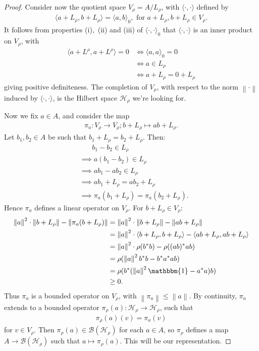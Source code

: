 \documentclass[11pt,a4paper]{report}
\theoremstyle{plain}
\theoremstyle{definition}
\newcommand{\1}{\mathbbm{1}}
\newcommand{\B}{\mathcal{B}}
\newcommand{\Hr}{\mathcal{H}_\rho}
\newcommand{\Vr}{V_\rho}
\begin{document}
\begin{proof}
	
	Consider now the quotient space $V_\rho = A / L_\rho$, with $\langle 
	\cdot,\cdot\rangle$ defined by
	\begin{align*}
		\langle a+L_\rho,b+L_\rho \rangle = \langle a,b\rangle_0, 
		\mbox{ for } a+L_\rho,b+L_\rho \in V_\rho.
	\end{align*}
	It follows from properties (i),~(ii) and (iii) of $\langle \cdot,\cdot  \rangle 
	_0$ that $\langle \cdot,\cdot  \rangle$ is an inner product on $V_\rho$, with
	\begin{align*}
				\langle a + L^\rho, a + L^\rho \rangle = 0
		&\iff 	\langle a,a\rangle_0=0													\\
		&\iff 	a \in L_\rho															\\
		&\iff 	a+L_\rho = 0+L_\rho
	\end{align*}
	giving positive definiteness.
	The completion of $V_\rho$, with respect to the norm $\left\|\cdot\right\|$ 
	induced by $\langle\cdot,\cdot \rangle$, is the Hilbert space $\Hr$ we're 
	looking for.

	Now we fix $a \in A$, and consider the map 
	\begin{align*}
		\pi_a : V_\rho \to V_\rho; b+L_\rho \mapsto ab+L_\rho.
	\end{align*}
	Let $b_1, b_2 \in A$ be such that $b_1+L_\rho = b_2+L_\rho$. Then:
	\begin{align*}
		&~~~~~~~~	b_1-b_2 \in L_\rho													\\	
		&\implies	a(b_1-b_2) \in L_\rho												\\	
		&\implies	ab_1-ab_2 \in L_\rho												\\	
		&\implies	ab_1 + L_\rho = ab_2+L_\rho											\\	
		&\implies	\pi_a(b_1+L_\rho) = \pi_a(b_2+L_\rho).
	\end{align*}
	Hence $\pi_a$ defines a linear operator on $V_\rho$.
	For $b+L_\rho \in V_\rho$:
	\begin{align*}
				\left\|a\right\|^2 \cdot \left\|b+L_\rho\right\| 
									- \left\| \pi_a(b+L_\rho) \right\|
		&=		\left\|a\right\|^2 \cdot \left\|b+L_\rho\right\| 
									- \left\| ab+L_\rho \right\|						\\
		&=		\left\|a\right\|^2 \cdot \langle b+L_\rho,b+L_\rho \rangle 
									- \langle ab+L_\rho,ab+L_\rho \rangle				\\
		&=		\left\|a\right\|^2 \cdot \rho(b^\ast b) - \rho ((ab)^\ast ab)			\\
		&= 		\rho (\left\|a\right\|^2 b^\ast b-b^\ast a^\ast ab)						\\
		&=		\rho (b^\ast (\left\|a\right\|^{2} \mathbbm{1} - a ^\ast a)b)			\\
		&\geq 	0.
	\end{align*}
	Thus $\pi_a$ is a bounded operator on $\Vr$, with $\left\|\pi_a\right\| \leq 
	\left\|a\right\|$. By continuity, $\pi_a$ extends to a bounded operator 
	$\pi_\rho(a):\Hr \to \Hr$, such that 
	\begin{align*} 
		\pi_\rho(a)(v) = \pi_a(v) 
	\end{align*} 
	for $v\in \Vr$. 
	Then $\pi_\rho(a) \in \B(\Hr)$ for each $a \in A$, so $\pi_\rho$ defines a map 
	$A \to \B(\Hr)$ such that $ a \mapsto \pi_\rho(a)$. This will be our 
	representation.


\end{proof}
\end{document}
